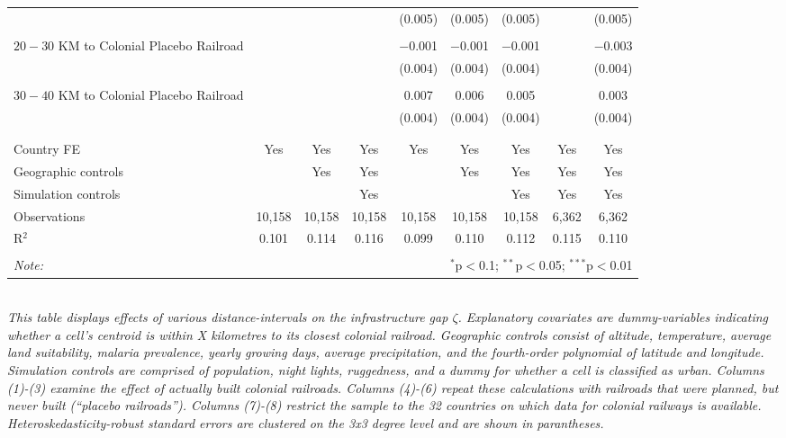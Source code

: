 \documentclass[11pt, oneside]{article}   	%
\begin{document}
\begin{table}[]
{\begin{tabular}{@{\extracolsep{5pt}}lcccccccc}
  &  &  &  & (0.005) & (0.005) & (0.005) &  & (0.005) \\
  & & & & & & & & \\
 $20-30$ KM to Colonial Placebo Railroad &  &  &  & $-$0.001 & $-$0.001 & $-$0.001 &  & $-$0.003 \\
  &  &  &  & (0.004) & (0.004) & (0.004) &  & (0.004) \\
  & & & & & & & & \\
 $30-40$ KM to Colonial Placebo Railroad &  &  &  & 0.007 & 0.006 & 0.005 &  & 0.003 \\
  &  &  &  & (0.004) & (0.004) & (0.004) &  & (0.004) \\
  & & & & & & & & \\
\hline \\[-1.8ex]
Country FE & Yes & Yes & Yes & Yes & Yes & Yes & Yes & Yes \\
Geographic controls &  & Yes & Yes &  & Yes & Yes & Yes & Yes \\
Simulation controls &  &  & Yes &  &  & Yes & Yes & Yes \\
Observations & 10,158 & 10,158 & 10,158 & 10,158 & 10,158 & 10,158 & 6,362 & 6,362 \\
R$^{2}$ & 0.101 & 0.114 & 0.116 & 0.099 & 0.110 & 0.112 & 0.115 & 0.110 \\
\hline
\hline \\[-1.8ex]
\textit{Note:}  & \multicolumn{8}{r}{$^{*}$p$<$0.1; $^{**}$p$<$0.05; $^{***}$p$<$0.01} \\
\end{tabular}

}

\justify
\textit{\\ \footnotesize This table displays effects of various distance-intervals on the infrastructure gap $\zeta$. Explanatory covariates are dummy-variables indicating whether a cell's centroid is within X kilometres to its closest colonial railroad. Geographic controls consist of altitude, temperature, average land suitability, malaria prevalence, yearly growing days, average precipitation, and the fourth-order polynomial of latitude and longitude. Simulation controls are comprised of population, night lights, ruggedness, and a dummy for whether a cell is classified as urban. Columns (1)-(3) examine the effect of actually built colonial railroads. Columns (4)-(6) repeat these calculations with railroads that were planned, but never built (``placebo railroads''). Columns (7)-(8) restrict the sample to the 32 countries on which data for colonial railways is available. Heteroskedasticity-robust standard errors are clustered on the 3x3 degree level and are shown in parantheses.}
\end{table}
\end{document}
